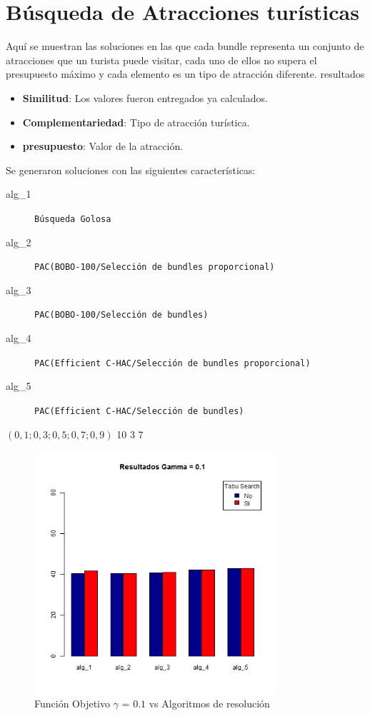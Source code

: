 \section{Búsqueda de Atracciones turísticas}\label{res:busAtracciones}
Aquí se muestran las soluciones en las que cada bundle representa un conjunto de atracciones que un turista puede visitar, cada uno de ellos no supera el presupuesto máximo y cada elemento es un tipo de atracción diferente. resultados
\begin{itemize}
  \item \textbf{Similitud}: Los valores fueron entregados ya calculados.
  \item \textbf{Complementariedad}: Tipo de atracción turística.
  \item \textbf{presupuesto}: Valor de la atracción.
\end{itemize}
Se generaron soluciones con las siguientes características:\\
\SolucionBudget
{}
{
\begin{description}
	\item[alg\_1] \texttt{Búsqueda Golosa}
	\item[alg\_2] \texttt{PAC(BOBO-100/Selección de bundles proporcional)}
	\item[alg\_3] \texttt{PAC(BOBO-100/Selección de bundles)}
	\item[alg\_4] \texttt{PAC(Efficient C-HAC/Selección de bundles proporcional)}
	\item[alg\_5] \texttt{PAC(Efficient C-HAC/Selección de bundles)}
\end{description}
}
{$(0,1; 0,3; 0,5; 0,7; 0,9)$}
{10}
{3}
{7}

\begin{figure}[H]
  \centering
    \includegraphics[width=0.8\textwidth]{resultados/cities/Graficos_agrupados/gamma01-cities.png}
  \caption{Función Objetivo $\gamma$ = $0.1$ vs Algoritmos de resolución}
  \label{res:img-cities-agr-gamma01}
\end{figure}


